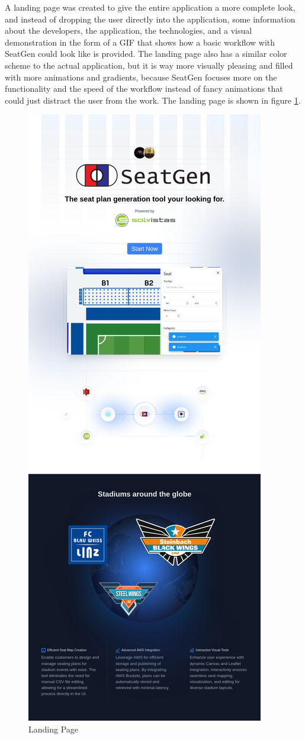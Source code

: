 A landing page was created to give the entire application a more complete look, and instead of dropping the user directly into the application, some information about the developers, the application, the technologies, and a visual demonstration in the form of a GIF that shows how a basic workflow with SeatGen could look like is provided. The landing page also has a similar color scheme to the actual application, but it is way more visually pleasing and filled with more animations and gradients, because SeatGen focuses more on the functionality and the speed of the workflow instead of fancy animations that could just distract the user from the work. The landing page is shown in figure \ref{fig:landing-page}.

\begin{figure}[H]
    \centering
    \includegraphics[scale=0.3]{pics/landing-page.png}
    \caption{Landing Page}
    \label{fig:landing-page}
\end{figure}
\newpage